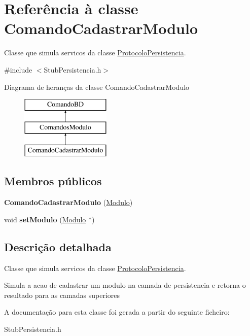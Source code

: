 \hypertarget{class_comando_cadastrar_modulo}{
\section{\-Referência à classe \-Comando\-Cadastrar\-Modulo}
\label{class_comando_cadastrar_modulo}
}


\-Classe que simula servicos da classe \hyperlink{class_protocolo_persistencia}{\-Protocolo\-Persistencia}.  




{\ttfamily \#include $<$\-Stub\-Persistencia.\-h$>$}

\-Diagrama de heranças da classe \-Comando\-Cadastrar\-Modulo\begin{figure}[H]
\begin{center}
\leavevmode
\includegraphics[height=3.000000cm]{class_comando_cadastrar_modulo}
\end{center}
\end{figure}
\subsection*{\-Membros públicos}
\begin{DoxyCompactItemize}
\item 
\hypertarget{class_comando_cadastrar_modulo_af2972198b3ac5bdc82c95e8daeb4a1ec}{
{\bfseries \-Comando\-Cadastrar\-Modulo} (\hyperlink{class_modulo}{\-Modulo})}
\label{class_comando_cadastrar_modulo_af2972198b3ac5bdc82c95e8daeb4a1ec}

\item 
\hypertarget{class_comando_cadastrar_modulo_a7fc9482a9b881200200f069b015af87e}{
void {\bfseries set\-Modulo} (\hyperlink{class_modulo}{\-Modulo} $\ast$)}
\label{class_comando_cadastrar_modulo_a7fc9482a9b881200200f069b015af87e}

\end{DoxyCompactItemize}


\subsection{\-Descrição detalhada}
\-Classe que simula servicos da classe \hyperlink{class_protocolo_persistencia}{\-Protocolo\-Persistencia}. 

\-Simula a acao de cadastrar um modulo na camada de persistencia e retorna o resultado para as camadas superiores 

\-A documentação para esta classe foi gerada a partir do seguinte ficheiro\-:\begin{DoxyCompactItemize}
\item 
\-Stub\-Persistencia.\-h\end{DoxyCompactItemize}
